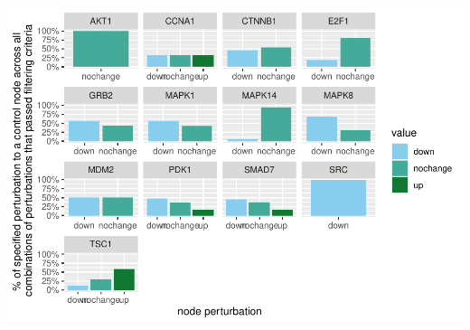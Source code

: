 \documentclass[
]{book}
\begin{document}
\includegraphics{_main_files/figure-latex/all-three-1.pdf}
\end{document}
